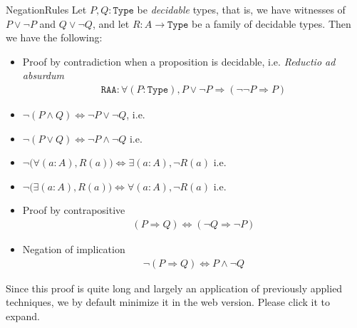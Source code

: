 \documentclass[11pt]{article}
\begin{document}
\begin{label theorem}{NegationRules}
Let $P,Q \colon \mathtt{Type}$ be \emph{decidable} types, that is, we have witnesses of $P \vee \neg P$ and $Q \vee \neg Q$, and let $R \colon A \to \mathtt{Type}$ be a family of decidable types. Then we have the following: \begin{itemize}
\item Proof by contradiction when a proposition is decidable, i.e. \emph{Reductio ad absurdum} \begin{gather*}
\mathtt{RAA}\colon \forall (P : \mathtt{Type} ), P \vee \neg P \Rightarrow ( \neg \neg P \Rightarrow P)
\end{gather*}
\item $\neg(P \wedge Q) \Leftrightarrow \neg P \vee \neg Q$, i.e. 
\item $\neg (P \vee Q) \Leftrightarrow \neg P \wedge \neg Q$ i.e. 
\item $\neg \big(\forall (a : A), R(a) \big) \Leftrightarrow \exists (a : A), \neg R(a)$ i.e. 
\item $\neg \big(\exists (a : A), R(a)\big) \Leftrightarrow \forall (a : A), \neg R(a)$ i.e. 
\item Proof by contrapositive \begin{gather*}
(P \Rightarrow Q) \Leftrightarrow (\neg Q \Rightarrow \neg P)
\end{gather*}
\item Negation of implication \begin{gather*}
\neg (P \Rightarrow Q) \Leftrightarrow P \wedge \neg Q
\end{gather*}
\end{itemize}
\end{label theorem}

Since this proof is quite long and largely an application of previously applied techniques, we by default minimize it in the web version. Please click it to expand.
\end{document}
